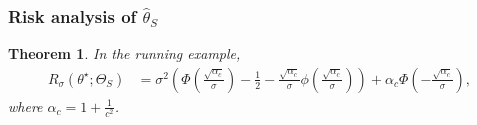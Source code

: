 \documentclass[11pt]{article}
\theoremstyle{plain}
\newtheorem{theorem}{Theorem}[section]
\theoremstyle{definition}
\newcommand{\hattheta}{\hat{\theta}}
\newcommand{\inparen}[1]{\left(#1\right)}             %
\begin{document}
\subsubsection{Risk analysis of \texorpdfstring{$\hattheta_S$}{theta-hat S}}

\begin{theorem}\label{thm:hatthetaSExactRisk}
    In the running example,
    \begin{align*}
        R_\sigma(\theta^\star; \Theta_S)
        &=
        \sigma^2 \inparen{ 
            \Phi \inparen{ \frac{\sqrt{\alpha_c}}{\sigma} }- \frac{1}{2} - \frac{\sqrt{\alpha_c}}{\sigma} \phi \inparen{ \frac{\sqrt{\alpha_c}}{\sigma}}
        }
        +
        \alpha_c \Phi \inparen{-\frac{\sqrt{\alpha_c}}{\sigma}},
    \end{align*}
    where $\alpha_c = 1+\frac{1}{c^2}$.
\end{theorem}
\end{document}
